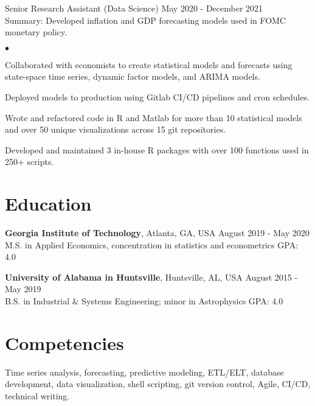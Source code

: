 \documentclass[margin, line]{res}
\newenvironment{list2}{
  \begin{list}{$\bullet$}{%
      \setlength{\itemsep}{0.04in}
      \setlength{\parsep}{0in} \setlength{\parskip}{0in}
      \setlength{\topsep}{0.05in} \setlength{\partopsep}{0in} 
      \setlength{\leftmargin}{\dimexpr 26pt-0.05in}}}
    {\end{list}}
\begin{document}
\begin{resume}
Senior Research Assistant (Data Science) \hfill May 2020 - December 2021 \\
\hspace*{3mm}
    Summary: Developed inflation and GDP forecasting models used in FOMC monetary policy.
    
    \begin{list2}
        \item Collaborated with economists to create statistical models and forecasts using state-space time series, dynamic factor models, and ARIMA models.
        \item Deployed models to production using Gitlab CI/CD pipelines and cron schedules.
        \item Wrote and refactored code in R and Matlab for more than 10 statistical models and over 50 unique visualizations across 15 git repositories. 
        \item Developed and maintained 3 in-house R packages with over 100 functions used in 250+ scripts.
    \end{list2}


\section{\sc Education }

{\bf Georgia Institute of Technology}, Atlanta, GA, USA \hfill August 2019 - May 2020\\
M.S. in Applied Economics, concentration in statistics and econometrics \hfill GPA: 4.0

\vspace{-.1cm}

{\bf University of Alabama in Huntsville}, Huntsville, AL, USA \hfill August 2015 - May 2019 \\
B.S. in Industrial \& Systems Engineering; minor in Astrophysics \hfill GPA: 4.0


\section{\sc Competencies} 
Time series analysis, forecasting, predictive modeling, ETL/ELT, database development, data visualization, shell scripting, git version control, Agile, CI/CD, technical writing.

\end{resume}
\end{document}
